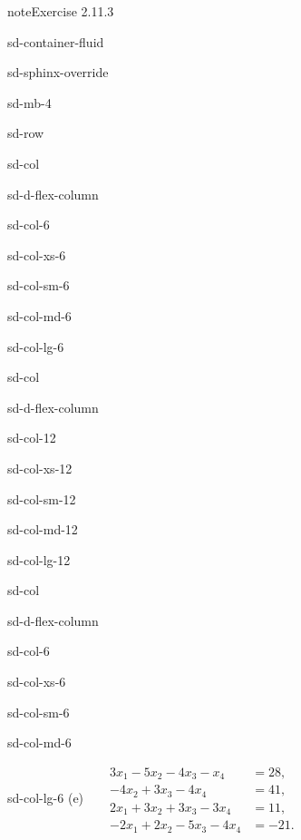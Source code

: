 \documentclass[letterpaper,10pt,english]{jupyterBook}
\begin{document}
\begin{sphinxadmonition}{note}{Exercise 2.11.3}
\begin{sphinxuseclass}{sd-container-fluid}
\begin{sphinxuseclass}{sd-sphinx-override}
\begin{sphinxuseclass}{sd-mb-4}
\begin{sphinxuseclass}{sd-row}
\begin{sphinxuseclass}{sd-col}
\begin{sphinxuseclass}{sd-d-flex-column}
\begin{sphinxuseclass}{sd-col-6}
\begin{sphinxuseclass}{sd-col-xs-6}
\begin{sphinxuseclass}{sd-col-sm-6}
\begin{sphinxuseclass}{sd-col-md-6}
\begin{sphinxuseclass}{sd-col-lg-6}
\end{sphinxuseclass}
\end{sphinxuseclass}
\end{sphinxuseclass}
\end{sphinxuseclass}
\end{sphinxuseclass}
\end{sphinxuseclass}
\end{sphinxuseclass}
\begin{sphinxuseclass}{sd-col}
\begin{sphinxuseclass}{sd-d-flex-column}
\begin{sphinxuseclass}{sd-col-12}
\begin{sphinxuseclass}{sd-col-xs-12}
\begin{sphinxuseclass}{sd-col-sm-12}
\begin{sphinxuseclass}{sd-col-md-12}
\begin{sphinxuseclass}{sd-col-lg-12}
\sphinxAtStartPar
 

\end{sphinxuseclass}
\end{sphinxuseclass}
\end{sphinxuseclass}
\end{sphinxuseclass}
\end{sphinxuseclass}
\end{sphinxuseclass}
\end{sphinxuseclass}
\begin{sphinxuseclass}{sd-col}
\begin{sphinxuseclass}{sd-d-flex-column}
\begin{sphinxuseclass}{sd-col-6}
\begin{sphinxuseclass}{sd-col-xs-6}
\begin{sphinxuseclass}{sd-col-sm-6}
\begin{sphinxuseclass}{sd-col-md-6}
\begin{sphinxuseclass}{sd-col-lg-6}
\sphinxAtStartPar
(e)  
\( \begin{align*}
     3 x_{1} - 5 x_{2} - 4 x_{3} -  x_{4} &= 28, \\
     - 4 x_{2} + 3 x_{3} - 4 x_{4} &= 41, \\
     2 x_{1} + 3 x_{2} + 3 x_{3} - 3 x_{4} &= 11, \\
     - 2 x_{1} + 2 x_{2} - 5 x_{3} - 4 x_{4} &= -21.
\end{align*} \)


\end{sphinxuseclass}
\end{sphinxuseclass}
\end{sphinxuseclass}
\end{sphinxuseclass}
\end{sphinxuseclass}
\end{sphinxuseclass}
\end{sphinxuseclass}
\end{sphinxuseclass}
\end{sphinxuseclass}
\end{sphinxuseclass}
\end{sphinxuseclass}
\end{sphinxadmonition}
\end{document}
